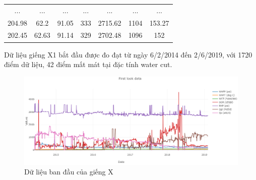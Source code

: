 \documentclass[12pt,a4paper]{report}
\begin{document}
\begin{table}[h]
\begin{tabular}{@{}ccccccc@{}}
    ...                                                         & ...                                                           & ...                                                              & ...                                                           & ...                                                        & ...                                                          & ...                                                         \\
    204.98                                                      & 62.2                                                          & 91.05                                                            & 333                                                           & 2715.62                                                    & 1104                                                         & 153.27                                                      \\
    202.45                                                      & 62.63                                                         & 91.14                                                            & 329                                                           & 2702.48                                                    & 1096                                                         & 152                                                         \\ \bottomrule
    \end{tabular}
    \end{table}
\newpage
Dữ liệu giếng X1 bắt đầu được đo đạt từ ngày 6/2/2014 đến 2/6/2019, với 1720 điểm dữ liệu, 42 điểm mất mát tại đặc tính water cut.
    \begin{figure}[h]
        \centering
        \includegraphics[scale=.55]{fig/first_look.PNG}
        \caption{Dữ liệu ban đầu của giếng X}
        \label{fig:first_look}
    \end{figure}
\newline
\end{document}
